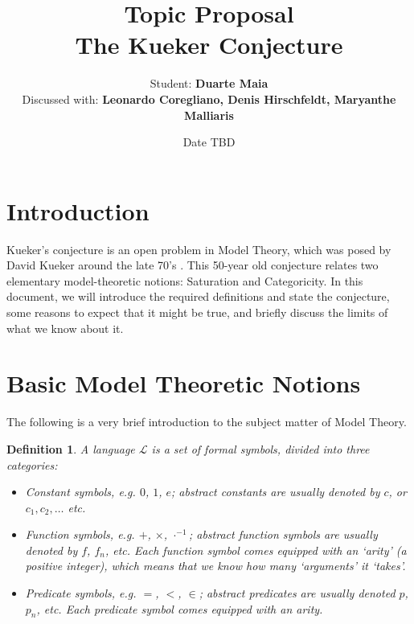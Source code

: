 \documentclass{article}
\title{Topic Proposal\\The Kueker Conjecture}
\author{Student: \textbf{Duarte Maia}\\[1ex]Discussed with: \textbf{Leonardo Coregliano, Denis Hirschfeldt, Maryanthe Malliaris}}
\date{Date TBD}
\newtheorem{definition}[theorem]{Definition}
\theoremstyle{nonumberplain}
\newcommand{\Lang}{\mathcal{L}}
\begin{document}
\maketitle

\tableofcontents

\section{Introduction}

Kueker's conjecture is an open problem in Model Theory, which was posed by David Kueker around the late 70's \cite{kuekersuperstable}. This 50-year old conjecture relates two elementary model-theoretic notions: Saturation and Categoricity. In this document, we will introduce the required definitions and state the conjecture, some reasons to expect that it might be true, and briefly discuss the limits of what we know about it.

\section{Basic Model Theoretic Notions}

The following is a very brief introduction to the subject matter of Model Theory.

\begin{definition}
A \emph{language} $\Lang$ is a set of formal symbols, divided into three categories:
\begin{itemize}
\item Constant symbols, e.g. $0$, $1$, $e$; abstract constants are usually denoted by $c$, or $c_1, c_2, \dots$ etc.
\item Function symbols, e.g. $+$, $\times$, $\cdot^{-1}$; abstract function symbols are usually denoted by $f$, $f_n$, etc. Each function symbol comes equipped with an `arity' (a positive integer), which means that we know how many `arguments' it `takes'.
\item Predicate symbols, e.g. $=$, $<$, $\in$; abstract predicates are usually denoted $p$, $p_n$, etc. Each predicate symbol comes equipped with an arity.
\end{itemize}
\end{definition}
\end{document}
